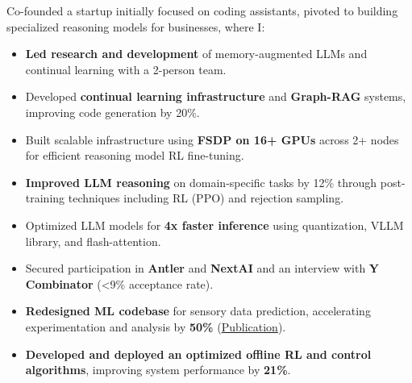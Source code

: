 {
}
Co-founded a startup initially focused on coding assistants, pivoted to building specialized reasoning models for businesses, where I:
\begin{itemize}
    \item \textbf{Led research and development} of memory-augmented LLMs and continual learning  with a 2-person team.
    \item Developed \textbf{continual learning infrastructure} and \textbf{Graph-RAG} systems, improving code generation by 20\%.
    \item Built scalable infrastructure using \textbf{FSDP on 16+ GPUs} across 2+ nodes for efficient reasoning model RL fine-tuning.
    \item \textbf{Improved LLM reasoning} on domain-specific tasks by 12\% through post-training techniques including RL (PPO) and rejection sampling.
    \item Optimized LLM models for \textbf{4x faster inference} using quantization, VLLM library, and flash-attention.
    \item Secured participation in \textbf{Antler} and \textbf{NextAI} and an interview with \textbf{Y Combinator} (<9\% acceptance rate).
\end{itemize}

{
}
\begin{itemize}
    \item \textbf{Redesigned ML codebase} for sensory data prediction, accelerating experimentation and analysis by \textbf{50\%} (\href{https://link.springer.com/article/10.1007/s10994-023-06413-x}{Publication}).
    \item \textbf{Developed and deployed an optimized offline RL and control algorithms}, improving system performance by \textbf{21\%}.
\end{itemize}

